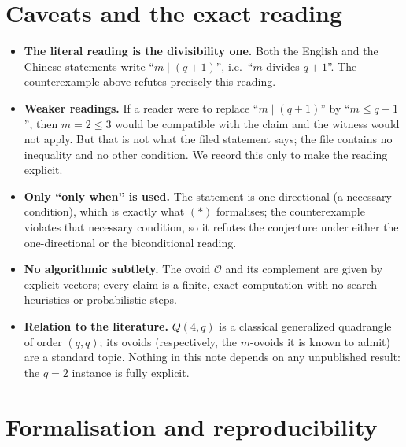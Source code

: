 \documentclass[11pt]{article}
\theoremstyle{definition}
\theoremstyle{remark}
\newcommand{\ov}{\mathcal{O}}
\begin{document}
\section{Caveats and the exact reading}

\begin{itemize}
\item \textbf{The literal reading is the divisibility one.} Both the English and
      the Chinese statements write ``$m \mid (q+1)$'', i.e.\ ``$m$ divides
      $q+1$''. The counterexample above refutes precisely this reading.
\item \textbf{Weaker readings.} If a reader were to replace ``$m \mid (q+1)$''
      by ``$m \le q+1$'', then $m=2 \le 3$ would be compatible with the claim
      and the witness would not apply. But that is not what the filed statement
      says; the file contains no inequality and no other condition. We record
      this only to make the reading explicit.
\item \textbf{Only ``only when'' is used.} The statement is one-directional
      (a necessary condition), which is exactly what $(\ast)$ formalises; the
      counterexample violates that necessary condition, so it refutes the
      conjecture under either the one-directional or the biconditional reading.
\item \textbf{No algorithmic subtlety.} The ovoid $\ov$ and its complement are
      given by explicit vectors; every claim is a finite, exact computation
      with no search heuristics or probabilistic steps.
\item \textbf{Relation to the literature.} $Q(4,q)$ is a classical generalized
      quadrangle of order $(q,q)$; its ovoids (respectively, the $m$-ovoids it
      is known to admit) are a standard topic. Nothing in this note depends on
      any unpublished result: the $q=2$ instance is fully explicit.
\end{itemize}

\section{Formalisation and reproducibility}
\end{document}

